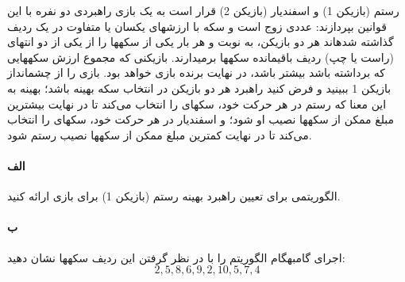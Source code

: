 \documentclass[]{article}
\begin{document}
رستم (بازیکن 1) و اسفندیار (بازیکن 2) قرار است به یک بازی راهبردی دو نفره با این قوانین بپردازند:  عددی زوج است و  سکه با ارزشهای یکسان یا متفاوت در یک ردیف گذاشته شدهاند
هر دو بازیکن، به نوبت و هر بار یکی از سکهها را از یکی از دو انتهای (راست یا چپ) ردیف باقیمانده سکهها برمیدارند.
بازیکنی که مجموع ارزش سکههایی که برداشته باشد بیشتر باشد، در نهایت برنده بازی خواهد بود.
بازی را از چشمانداز بازیکن 1 ببینید و فرض کنید راهبرد هر دو بازیکن در انتخاب سکه بهینه باشد؛ 
بهینه به این معنا که رستم در هر حرکت خود، سکهای را انتخاب ‌می‌کند تا در نهایت بیشترین مبلغ ممکن از سکهها نصیب او شود؛
و اسفندیار در هر حرکت خود، سکهای را انتخاب ‌می‌کند تا در نهایت کمترین مبلغ ممکن از سکهها نصیب رستم شود.

\paragraph*{الف}
الگوریتمی برای تعیین راهبرد بهینه رستم (بازیکن 1) برای بازی ارائه کنید.

\paragraph*{ب}
اجرای گامبهگام الگوریتم را با در نظر گرفتن این ردیف سکهها نشان دهید:
$$2, 5, 8, 6, 9, 2, 10, 5, 7, 4$$
\end{document}
